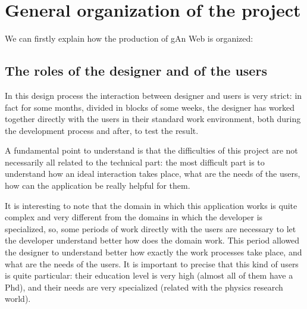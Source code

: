 
\chapter{General organization of the project} %

\label{Chapter3} %


We can firstly explain how the production of gAn Web is organized:

\section{The roles of the designer and of the users}
In this design process the interaction between designer and users is very strict: in fact for some months, divided in blocks of some weeks, the designer has worked together directly with the users in their standard work environment, both during the development process and after, to test the result. 

A fundamental point to understand is that the difficulties of this project are not necessarily all related to the technical part: the most difficult part is to understand how an ideal interaction takes place, what are the needs of the users, how can the application be really helpful for them.
 
It is interesting to note that the domain in which this application works is quite complex and very different from the domains in which the developer is specialized, so, some periods of work directly with the users are necessary to let the developer understand better how does the domain work.
This period allowed the designer to understand better how exactly the work processes take place, and what are the needs of the users. 
It is important to precise that this kind of users is quite particular: their education level is very high (almost all of them have a Phd), and their needs are very specialized (related with the physics research world).

